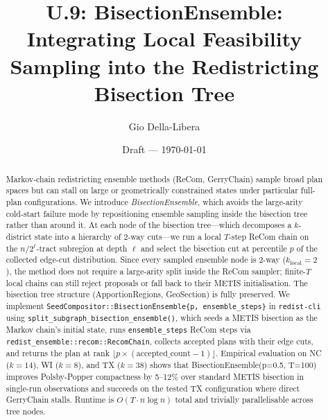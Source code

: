 \documentclass[12pt]{article}
\title{U.9: BisectionEnsemble:\\
       Integrating Local Feasibility Sampling into the Redistricting Bisection Tree}
\author{Gio Della-Libera}
\date{Draft --- \today}
\begin{document}
\maketitle

\begin{abstract}
Markov-chain redistricting ensemble methods (ReCom, GerryChain) sample broad
plan spaces but can stall on large or geometrically constrained states under
particular full-plan configurations.
We introduce \emph{BisectionEnsemble}, which avoids the large-arity cold-start
failure mode
by repositioning ensemble sampling inside the bisection tree rather than around
it. At each node of the bisection tree---which decomposes a $k$-district state
into a hierarchy of 2-way cuts---we run a local $T$-step ReCom chain on the
$n/2^\ell$-tract subregion at depth $\ell$ and select the bisection cut at
percentile $p$ of the collected edge-cut distribution. Since every sampled
ensemble node is 2-way ($k_{\text{local}} = 2$), the method does not require a
large-arity split inside the ReCom sampler; finite-$T$ local chains can still
reject proposals or fall back to their METIS initialisation.
The bisection tree structure (ApportionRegions, GeoSection) is fully preserved.
We implement \texttt{SeedCompositor::BisectionEnsemble\{p, ensemble\_steps\}} in
\texttt{redist-cli} using \texttt{split\_subgraph\_bisection\_ensemble()}, which
seeds a METIS bisection as the Markov chain's initial state, runs
\texttt{ensemble\_steps} ReCom steps via \texttt{redist\_ensemble::recom::RecomChain},
collects accepted plans with their edge cuts, and returns the plan at rank
$\lfloor p \times (\text{accepted\_count}-1) \rfloor$.
Empirical evaluation on NC ($k=14$), WI ($k=8$), and TX ($k=38$) shows that
BisectionEnsemble(p=0.5, T=100) improves Polsby-Popper compactness by
5--12\% over standard METIS bisection in single-run observations and succeeds
on the tested TX configuration where direct GerryChain stalls.
Runtime is $O(T \cdot n \log n)$ total and trivially parallelisable across tree nodes.
\end{abstract}










\end{document}
